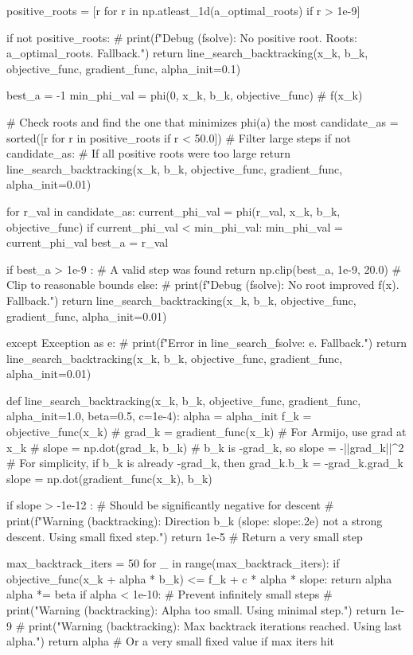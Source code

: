 \documentclass[12pt]{article} %
\begin{document}
\begin{python}
        positive_roots = [r for r in np.atleast_1d(a_optimal_roots) if r > 1e-9] 

        if not positive_roots:
            # print(f"Debug (fsolve): No positive root. Roots: {a_optimal_roots}. Fallback.")
            return line_search_backtracking(x_k, b_k, objective_func, gradient_func, alpha_init=0.1)

        best_a = -1
        min_phi_val = phi(0, x_k, b_k, objective_func) # f(x_k)
        
        # Check roots and find the one that minimizes phi(a) the most
        candidate_as = sorted([r for r in positive_roots if r < 50.0]) # Filter large steps
        if not candidate_as: # If all positive roots were too large
             return line_search_backtracking(x_k, b_k, objective_func, gradient_func, alpha_init=0.01)

        for r_val in candidate_as:
            current_phi_val = phi(r_val, x_k, b_k, objective_func)
            if current_phi_val < min_phi_val:
                min_phi_val = current_phi_val
                best_a = r_val
        
        if best_a > 1e-9 : # A valid step was found
             return np.clip(best_a, 1e-9, 20.0) # Clip to reasonable bounds
        else:
            # print(f"Debug (fsolve): No root improved f(x). Fallback.")
            return line_search_backtracking(x_k, b_k, objective_func, gradient_func, alpha_init=0.01)

    except Exception as e:
        # print(f"Error in line_search_fsolve: {e}. Fallback.")
        return line_search_backtracking(x_k, b_k, objective_func, gradient_func, alpha_init=0.01)

def line_search_backtracking(x_k, b_k, objective_func, gradient_func, alpha_init=1.0, beta=0.5, c=1e-4):
    alpha = alpha_init
    f_k = objective_func(x_k)
    # grad_k = gradient_func(x_k) # For Armijo, use grad at x_k
    # slope = np.dot(grad_k, b_k) # b_k is -grad_k, so slope = -||grad_k||^2
    # For simplicity, if b_k is already -grad_k, then grad_k.b_k = -grad_k.grad_k
    slope = np.dot(gradient_func(x_k), b_k)


    if slope > -1e-12 : # Should be significantly negative for descent
        # print(f"Warning (backtracking): Direction b_k (slope: {slope:.2e}) not a strong descent. Using small fixed step.")
        return 1e-5 # Return a very small step

    max_backtrack_iters = 50
    for _ in range(max_backtrack_iters):
        if objective_func(x_k + alpha * b_k) <= f_k + c * alpha * slope:
            return alpha
        alpha *= beta
        if alpha < 1e-10: # Prevent infinitely small steps
            # print("Warning (backtracking): Alpha too small. Using minimal step.")
            return 1e-9 
    # print("Warning (backtracking): Max backtrack iterations reached. Using last alpha.")
    return alpha # Or a very small fixed value if max iters hit


\end{python}
\end{document}
